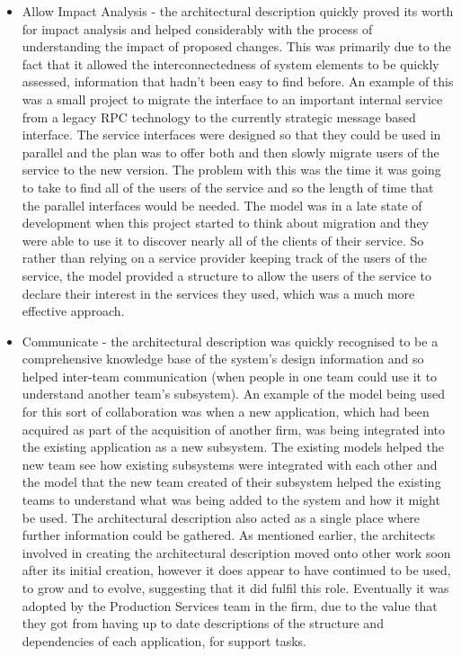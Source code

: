 \begin{itemize}
\item Allow Impact Analysis - the architectural description quickly proved its worth for impact analysis and helped considerably with the process of understanding the impact of proposed changes.  This was primarily due to the fact that it allowed the interconnectedness of system elements to be quickly assessed, information that hadn't been easy to find before.  An example of this was a small project to migrate the interface to an important internal service from a legacy RPC technology to the currently strategic message based interface.  The service interfaces were designed so that they could be used in parallel and the plan was to offer both and then slowly migrate users of the service to the new version.  The problem with this was the time it was going to take to find all of the users of the service and so the length of time that the parallel interfaces would be needed.  The model was in a late state of development when this project started to think about migration and they were able to use it to discover nearly all of the clients of their service.  So rather than relying on a service provider keeping track of the users of the service, the model provided a structure to allow the users of the service to declare their interest in the services they used, which was a much more effective approach.

\item Communicate - the architectural description was quickly recognised to be a comprehensive knowledge base of the system's design information and so helped inter-team communication (when people in one team could use it to understand another team's subsystem).  An example of the model being used for this sort of collaboration was when a new application, which had been acquired as part of the acquisition of another firm, was being integrated into the existing application as a new subsystem.  The existing models helped the new team see how existing subsystems were integrated with each other and the model that the new team created of their subsystem helped the existing teams to understand what was being added to the system and how it might be used.  The architectural description also acted as a single place where further information could be gathered.  As mentioned earlier, the architects involved in creating the architectural description moved onto other work soon after its initial creation, however it does appear to have continued to be used, to grow and to evolve, suggesting that it did fulfil this role.  Eventually it was adopted by the Production Services team in the firm, due to the value that they got from having up to date descriptions of the structure and dependencies of each application, for support tasks.

\end{itemize}

